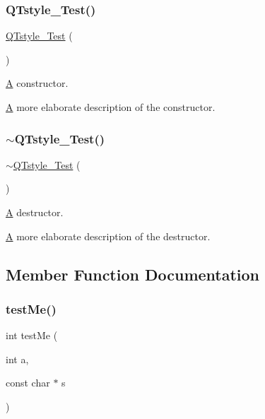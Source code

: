 \subsubsection{\texorpdfstring{Q\+Tstyle\+\_\+\+Test()}{QTstyle\_Test()}}
{\footnotesize\ttfamily \hyperlink{class_q_tstyle___test}{Q\+Tstyle\+\_\+\+Test} (\begin{DoxyParamCaption}{ }\end{DoxyParamCaption})}



\hyperlink{class_a}{A} constructor. 

\hyperlink{class_a}{A} more elaborate description of the constructor. \mbox{\label{class_q_tstyle___test_a3a2c6d99c82a00c5e3224aca01f6c7c3}} 
\subsubsection{\texorpdfstring{$\sim$\+Q\+Tstyle\+\_\+\+Test()}{~QTstyle\_Test()}}
{\footnotesize\ttfamily $\sim$\hyperlink{class_q_tstyle___test}{Q\+Tstyle\+\_\+\+Test} (\begin{DoxyParamCaption}{ }\end{DoxyParamCaption})}



\hyperlink{class_a}{A} destructor. 

\hyperlink{class_a}{A} more elaborate description of the destructor. 

\subsection{Member Function Documentation}
\mbox{\label{class_q_tstyle___test_af1299ea1b7efeb1548c7aba201ebe756}} 
\subsubsection{\texorpdfstring{test\+Me()}{testMe()}}
{\footnotesize\ttfamily int test\+Me (\begin{DoxyParamCaption}\item[{int}]{a,  }\item[{const char $\ast$}]{s }\end{DoxyParamCaption})}



